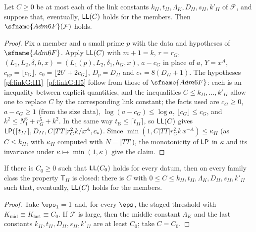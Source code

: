 \begin{lemma}\label{pf:linkG:adm6}
Let $C\ge0$ be at most each of the link constants $k_{II},t_{II},\Lambda_K,D_{II},s_{II},k'_{II}$ of $\mathcal F$, and
suppose that, eventually, $\mathsf{LL}(C)$ holds for the members. Then $\sfname{Adm6F}(\mathcal F)$ holds.
\end{lemma}

\begin{proof}
Fix a member and a small prime $p$ with the data and hypotheses of $\sfname{Adm6F}$. Apply $\mathsf{LL}(C)$ with
$m+1=k$, $r=r_G$, $(L_1,L_2,\delta,h,x)=(L_1(p),L_2,\delta_1,h_G,x)$, $a-c_G$ in place of $a$, $Y=x^A$,
$c_{pp}=\lfloor c_G\rfloor$, $c_0=\lfloor2b'+2c_G\rfloor$, $D_p=D_{II}$ and $c_*=8(D_{II}+1)$. The hypotheses
\ref{pf:linkG:H1}--\ref{pf:linkG:H5} follow from those of $\sfname{Adm6F}$: each is an inequality between explicit
quantities, and the inequalities $C\le k_{II},\dots,k'_{II}$ allow one to replace $C$ by the corresponding link constant;
the facts used are $c_G\ge0$, $a-c_G\ge1$ (from the size data), $\log(a-c_G)\le\log a$, $\lfloor c_G\rfloor\le c_G$,
and $k^2\le N_1^3+r_G^5+k^2$. In the same way $t_{\mathrm B}\le\lceil t_{II}\rceil$, so $\mathsf{LL}(C)$ gives
$\mathsf{LP}(\lceil t_{II}\rceil,D_{II},C|TT|r_G^2k/x^A,c_*)$. Since $\min(1,C|TT|r_G^2k\,x^{-A})\le\kappa_{II}$ (as $C\le
k_{II}$, with $\kappa_{II}$ computed with $N=|TT|$), the monotonicity of $\mathsf{LP}$ in $\kappa$ and its invariance under
$\kappa\mapsto\min(1,\kappa)$ give the claim.
\end{proof}

\begin{lemma}\label{pf:linkG:secondclosed}
If there is $C_0\ge0$ such that $\mathsf{LL}(C_0)$ holds for every datum, then on every family class the property
$\mathsf T_{II}$ is closed: there is $C$ with $0\le C\le k_{II},t_{II},\Lambda_K,D_{II},s_{II},k'_{II}$ such
that, eventually, $\mathsf{LL}(C)$ holds for the members.
\end{lemma}

\begin{proof}
Take $\eps_1=1$ and, for every $\eps$, the staged threshold with $K_{\mathrm{mid}}\equiv K_{\mathrm{last}}\equiv C_0$. If
$\mathcal F$ is large, then the middle constant $\Lambda_K$ and the last constants $k_{II},t_{II},D_{II},s_{II},k'_{II}$
are at least $C_0$; take $C=C_0$.
\end{proof}

